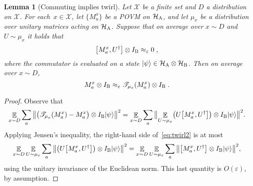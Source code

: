 \documentclass[11pt]{article}
\newtheorem{lemma}[theorem]{Lemma}
\theoremstyle{definition}
\newcommand{\ket}[1]{|#1\rangle}
\newcommand{\Id}{\ensuremath{I}}
\newcommand{\mH}{\ensuremath{\mathcal{H}}}
\newcommand{\eps}{\varepsilon}
\newcommand{\E}{\mathop{\mathbb{E}}\displaylimits} %
\newcommand{\labelstyle}[1]{\ensuremath{\textsc{#1}}\xspace}
\newcommand{\alice}{\labelstyle{A}}
\newcommand{\bob}{\labelstyle{B}}
\renewcommand{\cal}[1]{\mathcal{#1}}
\begin{document}
\begin{lemma}[Commuting implies twirl]
  \label{lem:mixing-U}
	Let $\cal{X}$ be a finite set and $D$ a distribution on $\cal{X}$. 
  For each~$x\in \cal{X}$, let $\{ M^x_a \}$ be a POVM on $\mH_\alice$, and let
  $\mu_x$ be a distribution over unitary matrices acting on $\mH_\alice$.
  Suppose that on average over $x \sim D$ and $U \sim \mu_x$ it holds that
  \begin{equation*}
    \bigl[ M^x_a , U^\dagger \bigr] \otimes \Id_\bob \approx_{\eps} 0\;,
  \end{equation*}
  where the commutator is evaluated on a state $\ket{\psi} \in \mH_\alice
  \otimes \mH_\bob$.
  Then on average over $x\sim D$,
  \begin{equation*}
    M^x_a \otimes \Id_\bob \approx_\eps \mathscr{T}_{\mu_x} ( M^x_a ) \otimes
    \Id_\bob \;.
  \end{equation*}
\end{lemma}

\begin{proof}
  Observe that
  \begin{equation}
    \E_{x\sim D} \sum_a \, \bigl\| \bigl( \mathscr{T}_{\mu_x} (M^x_a) - M^x_a
    \bigr) \otimes \Id_\bob \ket{\psi} \bigr\|^2 =
    \E_{x\sim D} \sum_a \, \bigl\| \E_{U\sim \mu_x} \bigl( U \big[ M^x_a, U^\dagger
    \bigr] \bigr) \otimes \Id_\bob \ket{\psi} \bigr\|^2.
    \label{eq:twirl2}
  \end{equation}
	Applying Jensen's inequality, the right-hand side of~\eqref{eq:twirl2} is at
  most
  \begin{equation*}
    \E_{x\sim D} \E_{U\sim \mu_x} \sum_a \, \bigl\| \bigl( U \big[ M^x_a, U^\dagger
    \bigr] \bigr) \otimes \Id_\bob \ket{\psi} \bigr\|^2
    = \E_{x\sim D} \E_{U\sim \mu_x} \sum_a \, \bigl\| \big[ M^x_a, U^\dagger
    \bigr]  \otimes \Id_\bob \ket{\psi} \bigr\|^2,
  \end{equation*}
  using the unitary invariance of the Euclidean norm.
  This last quantity is $O(\eps)$, by assumption.
\end{proof}
\end{document}
